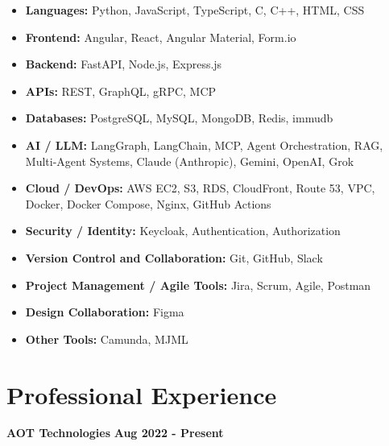 \documentclass[10pt,a4paper]{article}
\begin{document}
\begin{itemize}
    \item \textbf{Languages:} Python, JavaScript, TypeScript, C, C++, HTML, CSS

    \item \textbf{Frontend:} Angular, React, Angular Material, Form.io

    \item \textbf{Backend:} FastAPI, Node.js, Express.js

    \item \textbf{APIs:} REST, GraphQL, gRPC, MCP

    \item \textbf{Databases:} PostgreSQL, MySQL, MongoDB, Redis, immudb

    \item \textbf{AI / LLM:} LangGraph, LangChain, MCP, Agent Orchestration, RAG, Multi-Agent Systems, Claude (Anthropic), Gemini, OpenAI, Grok

    \item \textbf{Cloud / DevOps:} AWS EC2, S3, RDS, CloudFront, Route 53, VPC, Docker, Docker Compose, Nginx, GitHub Actions

    \item \textbf{Security / Identity:} Keycloak, Authentication, Authorization

    \item \textbf{Version Control and Collaboration:} Git, GitHub, Slack

    \item \textbf{Project Management / Agile Tools:} Jira, Scrum, Agile, Postman

    \item \textbf{Design Collaboration:} Figma

    \item \textbf{Other Tools:} Camunda, MJML
\end{itemize}

\section*{Professional Experience}

\textbf{AOT Technologies} \hfill \textbf{Aug 2022 - Present}
\end{document}
